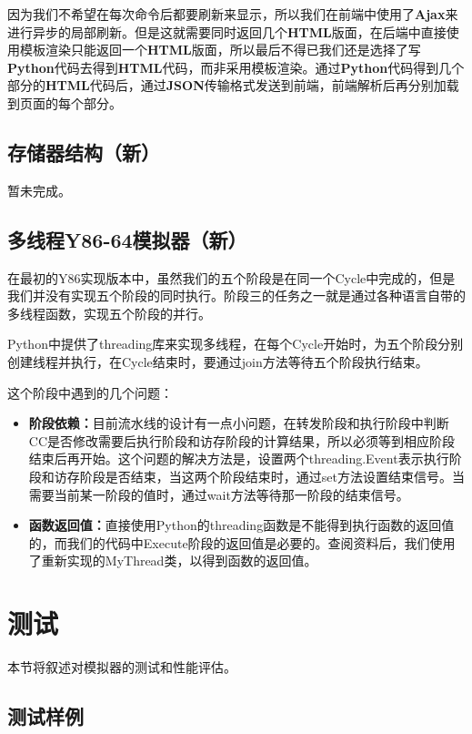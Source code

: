 \documentclass[12pt]{article} %
\begin{document}
\begin{sloppypar}
因为我们不希望在每次命令后都要刷新来显示，所以我们在前端中使用了{\bf Ajax}来进行异步的局部刷新。但是这就需要同时返回几个{\bf HTML}版面，在后端中直接使用模板渲染只能返回一个{\bf HTML}版面，所以最后不得已我们还是选择了写{\bf Python}代码去得到{\bf HTML}代码，而非采用模板渲染。通过{\bf Python}代码得到几个部分的{\bf HTML}代码后，通过{\bf JSON}传输格式发送到前端，前端解析后再分别加载到页面的每个部分。

\subsection{存储器结构（新）}

暂未完成。

\subsection{多线程Y86-64模拟器（新）}

在最初的Y86实现版本中，虽然我们的五个阶段是在同一个Cycle中完成的，但是我们并没有实现五个阶段的同时执行。阶段三的任务之一就是通过各种语言自带的多线程函数，实现五个阶段的并行。

Python中提供了threading库来实现多线程，在每个Cycle开始时，为五个阶段分别创建线程并执行，在Cycle结束时，要通过join方法等待五个阶段执行结束。

这个阶段中遇到的几个问题：

\begin{itemize}
\item {\bf 阶段依赖：}目前流水线的设计有一点小问题，在转发阶段和执行阶段中判断CC是否修改需要后执行阶段和访存阶段的计算结果，所以必须等到相应阶段结束后再开始。这个问题的解决方法是，设置两个threading.Event表示执行阶段和访存阶段是否结束，当这两个阶段结束时，通过set方法设置结束信号。当需要当前某一阶段的值时，通过wait方法等待那一阶段的结束信号。
\item {\bf 函数返回值：}直接使用Python的threading函数是不能得到执行函数的返回值的，而我们的代码中Execute阶段的返回值是必要的。查阅资料后，我们使用了重新实现的MyThread类，以得到函数的返回值。
\end{itemize}

\clearpage
\section{测试}

本节将叙述对模拟器的测试和性能评估。

\subsection{测试样例}


\end{sloppypar}
\end{document}
